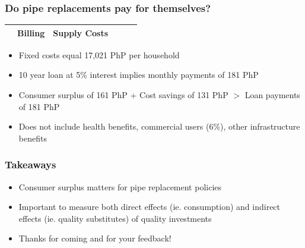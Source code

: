 \documentclass[aspectratio=32]{beamer}
\begin{document}

\begin{frame}
\frametitle{Do pipe replacements pay for themselves?}

\begin{table}[h!] 
\centering
\begin{threeparttable}
\begin{tabular}{@{}l*{1}{CCCCC}@{}}
\toprule
  & Billing  & Supply Costs \\
\midrule

\bottomrule
\end{tabular}
\begin{tablenotes}
\footnotesize
\item 
\end{tablenotes}
\end{threeparttable}
\end{table}

\begin{itemize}
  \item Fixed costs equal 17,021 PhP per household
  \item 10 year loan at 5\% interest implies monthly payments of 181 PhP
  \item Consumer surplus of 161 PhP + Cost savings of 131 PhP $>$ Loan payments of 181 PhP
  \item Does not include health benefits, commercial users (6\%), other infrastructure benefits
\end{itemize}

\end{frame}


\begin{frame}

\frametitle{Takeaways}

\begin{itemize}
  \item Consumer surplus matters for pipe replacement policies
  \item Important to measure both direct effects (ie. consumption) and indirect effects (ie. quality substitutes) of quality investments
  \item Thanks for coming and for your feedback!
\end{itemize}


\end{frame}



\end{document}
